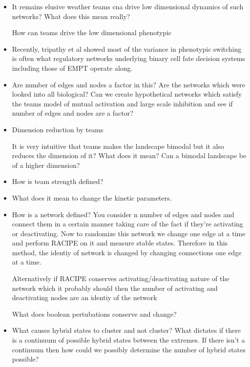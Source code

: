 \documentclass{article}
\begin{document}
\begin{itemize}

\item It remains elusive weather teams cna drive low dimensional dynamics of such networks? 
What does this mean really?

How can teams drive the low dimensional phenotypic 

\item Recently, tripathy et al showed most of the variance in phenotypic switching is often what regulatory networks underlying binary cell fate decision systems including those of EMPT operate along.

\item Are number of edges and nodes a factor in this?  Are the networks which were looked into all biological? Can we create hypothetical networks which satisfy the teams model of mutual activation and large scale inhibition and see if number of edges and nodes are a factor?

\item Dimension reduction by teams

	It is very intuitive that teams makes the landscape bimodal but it also reduces the dimension of it? What does it mean? Can a bimodal landscape be of a higher dimension?

\item How is team strength defined? 

\item What does it mean to change the kinetic parameters. 

\item How is a network defined? You consider n number of edges and nodes and connect them in a certain manner taking care of the fact if they're activating or deactivating. Now to randomize this network we change one edge at a time and perform RACIPE on it and measure stable states. Therefore in this method, the identiy of network is changed by changing connections one edge at a time. 

	Alternatively if RACIPE conserves activating/deactivating nature of the network which it probably should then the number of activating and deactivating nodes are an identiy of the network

	What does boolean pertubations conserve and change?

\item What causes hybrid states to cluster and not cluster? What dictates if there is a continuum of possible hybrid states between the extremes. If there isn't a continuum then how could we possibly determine the number of hybrid states possible?



\end{itemize}
\end{document}
